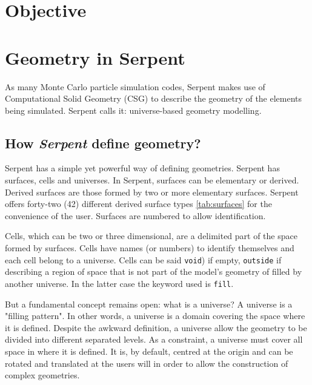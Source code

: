 \documentclass{elsarticle}
\begin{document}
\section{Objective}


\section{Geometry in Serpent}

As many Monte Carlo particle simulation codes, Serpent makes use of Computational Solid Geometry (CSG) to
describe the geometry of the elements being simulated. Serpent calls it: universe-based geometry modelling.



\subsection{How \textit{Serpent} define geometry?}

Serpent has a simple yet powerful way of defining geometries. Serpent has 
surfaces, cells and universes. In Serpent, surfaces can be elementary or 
derived. Derived surfaces are those formed by two or more elementary surfaces. 
Serpent offers forty-two (42) different derived surface types \ref{tab:surfaces} for the convenience of the user. Surfaces are numbered to allow identification.

Cells, which can be two or three dimensional, are a delimited part of the space 
formed by surfaces. Cells have names (or numbers) to identify themselves and 
each cell belong to a universe. Cells can be said \texttt{void}) if 
empty, \texttt{outside} if describing a region of space that is not part 
of the model's geometry of filled by another universe. In the latter case the 
keyword used is \texttt{fill}.

But a fundamental concept remains open: what is a universe? A universe is a "filling pattern". In other words, a universe is a domain covering the space where it is defined. Despite the awkward definition, a universe allow the geometry to 
be divided into different separated levels. As a constraint, a universe must 
cover all space in where it is defined. It is, by default, centred at the 
origin and can be rotated and translated at the users will in order to allow 
the construction of complex geometries.
\end{document}
